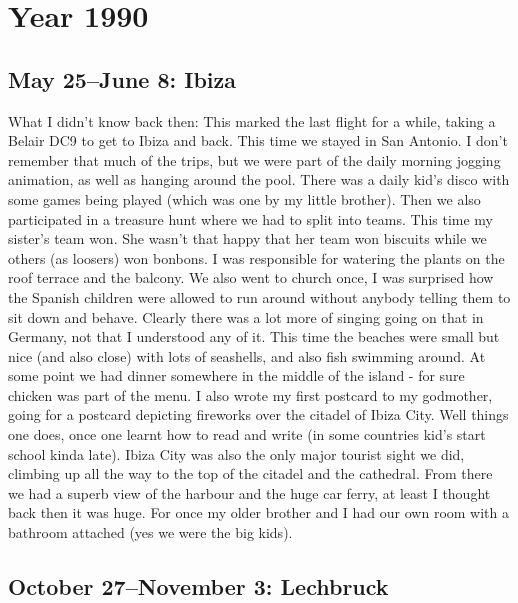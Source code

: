 \chapter{Year 1990}
\label{1990}

\section{May 25--June 8: Ibiza}
\label{1990:Ibiza}

What I didn't know back then: This marked the last flight for a while, taking a Belair DC9 to get to Ibiza and back. This time we stayed in San Antonio. I don't remember that much of the trips, but we were part of the daily morning jogging animation, as well as hanging around the pool. There was a daily kid's disco with some games being played (which was one by my little brother). Then we also participated in a treasure hunt where we had to split into teams. This time my sister's team won. She wasn't that happy that her team won biscuits while we others (as loosers) won bonbons. I was responsible for watering the plants on the roof terrace and the balcony. We also went to church once, I was surprised how the Spanish children were allowed to run around without anybody telling them to sit down and behave. Clearly there was a lot more of singing going on that in Germany, not that I understood any of it. This time the beaches were small but nice (and also close) with lots of seashells, and also fish swimming around. At some point we had dinner somewhere in the middle of the island - for sure chicken was part of the menu. I also wrote my first postcard to my godmother, going for a postcard depicting fireworks over the citadel of Ibiza City. Well things one does, once one learnt how to read and write (in some countries kid's start school kinda late). Ibiza City was also the only major tourist sight we did, climbing up all the way to the top of the citadel and the cathedral. From there we had a superb view of the harbour and the huge car ferry, at least I thought back then it was huge. For once my older brother and I had our own room with a bathroom attached (yes we were the big kids).


\section{October 27--November 3: Lechbruck}
\label{1990: Lechbruck}

